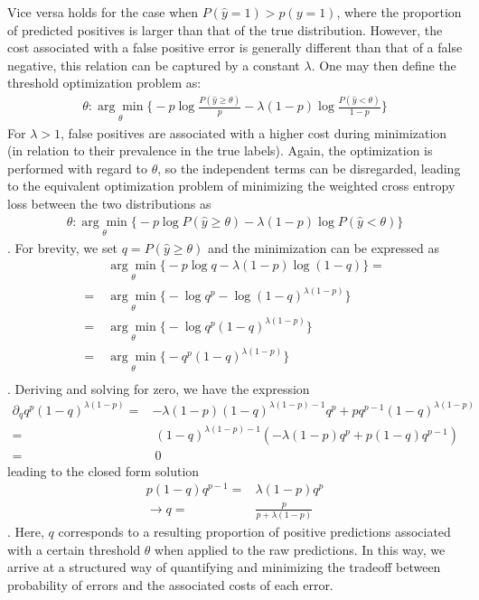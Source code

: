 \documentclass{article}
\begin{document}
Vice versa holds for the case when $P(\hat{y}=1) > p(y=1)$, where the proportion of predicted positives is larger than that of the true distribution.
However, the cost associated with a false positive error is generally different than that of a false negative, this relation can be captured by a constant $\lambda$. One may then define the threshold optimization problem as:  
\begin{align}
    \theta: \underset{\theta}{\arg \min} \Big\{ - p \log \frac{P(\hat{y}\geq \theta)}{p} - \lambda (1-p) \log \frac{P(\hat{y} < \theta)}{1-p} \Big \}
\end{align}
For $\lambda>1$, false positives are associated with a higher cost during minimization (in relation to their prevalence in the true labels).
Again, the optimization is performed with regard to $\theta$, so the independent terms can be disregarded, leading to the equivalent optimization problem of minimizing the weighted cross entropy loss between the two distributions as
\begin{align}
\label{eq:threshold} 
\theta: \underset{\theta}{\arg \min} \Big\{ - p \log P(\hat{y}\geq \theta) - \lambda (1-p) \log P(\hat{y} < \theta) \Big \} 
\end{align}.
For brevity, we set $q = P(\hat{y}\geq \theta)$ and the minimization can be expressed as
\begin{align*}
& \ \underset{\theta}{\arg \min} \Big\{ - p \log q - \lambda (1-p) \log (1-q) \Big \} = \\
=& \ \underset{\theta}{\arg \min} \Big\{ - \log q^p - \log (1-q)^{\lambda(1-p)} \Big \} \\
=& \ \underset{\theta}{\arg \min} \Big\{ - \log q^p (1-q)^{\lambda(1-p)} \Big \} \\
=& \ \underset{\theta}{\arg \min} \Big\{ - q^p (1-q)^{\lambda(1-p)} \Big \} \\
\end{align*}.
Deriving and solving for zero, we have the expression
\begin{align*}
\partial_q q^p (1-q)^{\lambda(1-p)} =& -\lambda(1-p)(1-q)^{\lambda(1-p)-1}q^p + pq^{p-1}(1-q)^{\lambda(1-p)} \\
=& \ (1-q)^{\lambda(1-p)-1}(-\lambda(1-p)q^p + p(1-q)q^{p-1}) \\
=& \ 0
\end{align*}
leading to the closed form solution
\begin{align}
p(1-q)q^{p-1} =& \lambda(1-p)q^p \\
\rightarrow q =& \frac{p}{p + \lambda(1-p)}
\label{eq:pos}
\end{align}.
Here, $q$ corresponds to a resulting proportion of positive predictions associated with a certain threshold $\theta$ when applied to the raw predictions.
In this way, we arrive at a structured way of quantifying and minimizing the tradeoff between probability of errors and the associated costs of each error.
\end{document}
